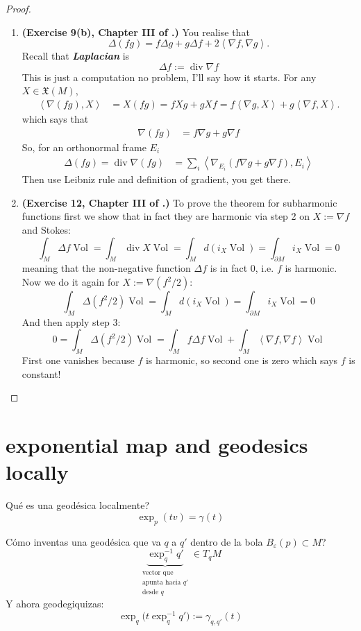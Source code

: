 \begin{proof}
\begin{enumerate}[label=\textbf{Step \arabic*}]
	\item \textbf{(Exercise 9(b), Chapter III of  \cite{doc}.)} You realise that
	\[\Delta(fg)=f \Delta g + g \Delta f+2\left<\nabla f,\nabla g\right>.\]
	Recall that \textit{\textbf{Laplacian}} is
	\[\Delta f:=\operatorname{div} \nabla f\]
	This is just a computation no problem, I'll say how it starts. For any \(X \in \mathfrak{X}(M)\),
	\begin{align*}
	\left<\nabla(fg),X\right>&=X(fg)=fXg+gXf=f\left<\nabla g,X\right>+g\left<\nabla f,X\right>.
	\end{align*}
	which says that	\begin{align*}\nabla(fg)&=f \nabla g+g \nabla f\end{align*}
	So, for an orthonormal frame \(E_i\)
	\begin{align*}\Delta(fg)=\operatorname{div} \nabla(fg)&=\sum_i\left<\nabla_{E_i}(f \nabla g+g \nabla f),E_i\right>
	\end{align*}
	Then use Leibniz rule and definition of gradient, you get there.
	
\item \textbf{(Exercise 12, Chapter III of  \cite{doc}.)} To prove the theorem for subharmonic functions first we show that in fact they are harmonic via step 2 on \(X:= \nabla f\) and Stokes:
	\[\int_M \Delta f \operatorname{Vol}=\int_M \operatorname{div}X \operatorname{Vol}=\int_M d(i_X \operatorname{Vol})=\int_{\partial M}i_X \operatorname{Vol}=0\]
meaning that the non-negative function \(\Delta f\) is in fact 0, i.e. \(f\) is harmonic. Now we do it again for \(X:=\nabla(f^2/2)\):
	\[\int_M \Delta(f^2/2)\operatorname{Vol}=\int_M d(i_X \operatorname{Vol})=\int_{\partial M}i_X \operatorname{Vol}=0\]
	And then apply step 3:
	\[0=\int_M \Delta(f^2/2)\operatorname{Vol}=\int_M f \Delta f \operatorname{Vol}+\int_M \left<\nabla f,\nabla f\right>\operatorname{Vol}\]
First one vanishes because \(f\) is harmonic, so second one is zero which says \(f\) is constant!
\end{enumerate}
\end{proof}

\section{exponential map and geodesics locally}

Qué es una geodésica localmente?
\[\operatorname{exp}_p(tv)=\gamma(t)\]

Cómo inventas una geodésica que va \(q\) a \(q'\) dentro de la bola \(B_\varepsilon(p)\subset M\)?
\[\underbrace{\operatorname{exp}_q^{-1}q'}_{\substack{\text{vector que}  \\\text{apunta hacia \(q'\)}\\\text{desde \(q\)}   }} \in T_q M\]
Y ahora geodegiquizas:
\[\operatorname{exp}_q\Big(t\operatorname{exp}_q^{-1}q'\Big):=\gamma_{q,q'}(t)\]

